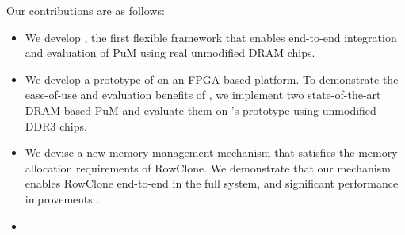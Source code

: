 
Our contributions are as follows:

\begin{itemize}
  \item We develop \X, the first flexible framework that enables end-to-end integration and evaluation of PuM  using real {unmodified} DRAM chips.
  
  \item We develop a prototype of \X on an FPGA-based platform. To demonstrate the ease-of-use {and evaluation benefits} of \X, we implement two state-of-the-art DRAM-based PuM  and evaluate them on \X's prototype {using unmodified DDR3 chips}. 
  
  \item We devise a new memory management mechanism that satisfies the memory allocation  requirements of RowClone. We demonstrate that our mechanism enables RowClone end-to-end {in the full system, and}  significant performance improvements . 
  
  \item {}
\end{itemize}
